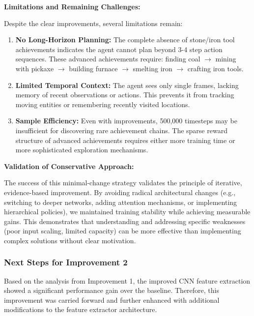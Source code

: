 \documentclass[twocolumn]{article}
\begin{document}
\textbf{Limitations and Remaining Challenges:}

Despite the clear improvements, several limitations remain:

\begin{enumerate}
    \item \textbf{No Long-Horizon Planning:} The complete absence of stone/iron tool achievements indicates the agent cannot plan beyond 3-4 step action sequences. These advanced achievements require: finding coal $\rightarrow$ mining with pickaxe $\rightarrow$ building furnace $\rightarrow$ smelting iron $\rightarrow$ crafting iron tools.
    
    \item \textbf{Limited Temporal Context:} The agent sees only single frames, lacking memory of recent observations or actions. This prevents it from tracking moving entities or remembering recently visited locations.
    
    \item \textbf{Sample Efficiency:} Even with improvements, 500,000 timesteps may be insufficient for discovering rare achievement chains. The sparse reward structure of advanced achievements requires either more training time or more sophisticated exploration mechanisms.
\end{enumerate}

\textbf{Validation of Conservative Approach:}

The success of this minimal-change strategy validates the principle of iterative, evidence-based improvement. By avoiding radical architectural changes (e.g., switching to deeper networks, adding attention mechanisms, or implementing hierarchical policies), we maintained training stability while achieving measurable gains. This demonstrates that understanding and addressing specific weaknesses (poor input scaling, limited capacity) can be more effective than implementing complex solutions without clear motivation.

\subsubsection*{Next Steps for Improvement 2}

Based on the analysis from Improvement 1, the improved CNN feature extraction showed a significant performance gain over the baseline. Therefore, this improvement was carried forward and further enhanced with additional modifications to the feature extractor architecture.
\end{document}
